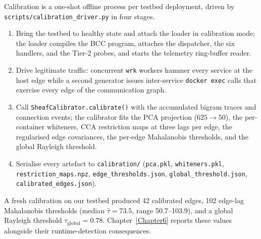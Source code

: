 Calibration is a one-shot offline process per testbed deployment, driven
by \texttt{scripts/calibration\_driver.py} in four stages.

\begin{enumerate}
  \item Bring the testbed to healthy state and attach the loader in
    calibration mode; the loader compiles the BCC program, attaches the
    dispatcher, the six handlers, and the Tier-2 probes, and starts the
    telemetry ring-buffer reader.
  \item Drive legitimate traffic: concurrent \texttt{wrk} workers hammer
    every service at the host edge while a second generator issues
    inter-service \texttt{docker exec} calls that exercise every edge of
    the communication graph.
  \item Call \texttt{SheafCalibrator.calibrate()} with the accumulated
    bigram traces and connection events; the calibrator fits the PCA
    projection ($625 \to 50$), the per-container whiteners, CCA
    restriction maps at three lags per edge, the regularised edge
    covariances, the per-edge Mahalanobis thresholds, and the global
    Rayleigh threshold.
  \item Serialise every artefact to \texttt{calibration/}
    (\texttt{pca.pkl}, \texttt{whiteners.pkl},
    \texttt{restriction\_maps.npz}, \texttt{edge\_thresholds.json},
    \texttt{global\_threshold.json}, \texttt{calibrated\_edges.json}).
\end{enumerate}

A fresh calibration on our testbed produced 42 calibrated edges, 102
edge-lag Mahalanobis thresholds (median $\hat\tau = 73.5$, range
50.7--103.9), and a global Rayleigh threshold
$\tau_{\text{global}} = 0.78$. Chapter~\ref{Chapter6} reports these values
alongside their runtime-detection consequences.
